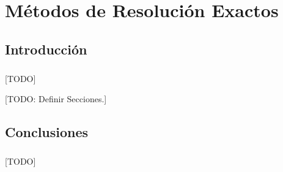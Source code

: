\documentclass{subfiles}
\begin{document}
  \chapter{Métodos de Resolución Exactos}
  \label{chap:exacts}

    \section{Introducción}
    \label{sec:exacts_introduction}

      \paragraph{}
      [TODO]

    [TODO: Definir Secciones.]

    \section{Conclusiones}
    \label{sec:exacts_conclusions}

      \paragraph{}
      [TODO]
\end{document}
